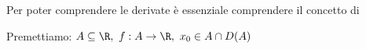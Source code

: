 \documentclass[../analisi.tex]{subfiles}
\begin{document}
Per poter  comprendere le derivate è essenziale comprendere il concetto di 
\\

\begin{defn}
Premettiamo: $ \acr,\ f: A \to \R,\ x_0 \in A \cap D(A)$
	
\end{defn}
\end{document}
